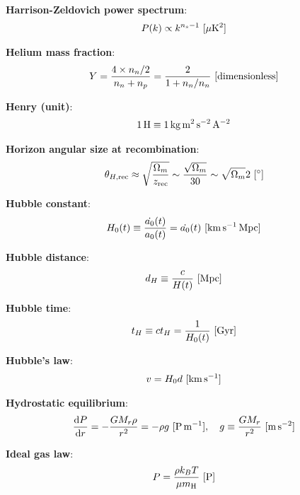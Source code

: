\documentclass[a4paper,10pt]{article}
\begin{document}
{\noindent}\textbf{Harrison-Zeldovich power spectrum}:
\begin{align*}
    P(k) \propto k^{n_s-1} ~ [{\rm \mu K^2}]
\end{align*}

{\noindent}\textbf{Helium mass fraction}:
\begin{align*}
    Y = \frac{4\times n_n/2}{n_n + n_p}  = \frac{2}{1 + n_n/n_n} ~ [{\rm dimensionless}]
\end{align*}

{\noindent}\textbf{Henry (unit)}:
\begin{align*}
    {\rm 1\,H \equiv 1\,kg\,m^2\,s^{-2}\,A^{-2}}
\end{align*}

{\noindent}\textbf{Horizon angular size at recombination}:
\begin{align*}
    \theta_{H,\mathrm{rec}} \approx \sqrt{\frac{\Omega_m}{z_\mathrm{rec}}} \sim \frac{\sqrt{\Omega_m}}{30} \sim \sqrt{\Omega_m}2 ~ [{\rm ^\circ}]
\end{align*}

{\noindent}\textbf{Hubble constant}:
\begin{align*}
    H_0(t) \equiv \dfrac{\dot{a_0}(t)}{a_0(t)} = \dot{a_0}(t) ~ [{\rm km\,s^{-1}\,Mpc}]
\end{align*}

{\noindent}\textbf{Hubble distance}:
\begin{align*}
    d_H \equiv \frac{c}{H(t)} ~ [{\rm Mpc}]
\end{align*}

{\noindent}\textbf{Hubble time}:
\begin{align*}
    t_H \equiv ct_H = \frac{1}{H_0(t)} ~ [{\rm Gyr}]
\end{align*}

{\noindent}\textbf{Hubble's law}:
\begin{align*}
    v = H_0d ~ [{\rm km\,s^{-1}}]
\end{align*}

{\noindent}\textbf{Hydrostatic equilibrium}:
\begin{align*}
    \frac{{\rm d}P}{{\rm d}r} = -\frac{GM_r\rho}{r^2} = -\rho g ~ [{\rm P\,m^{-1}}], ~~~ g \equiv \frac{GM_r}{r^2} ~ [{\rm m\,s^{-2}}]
\end{align*}

{\noindent}\textbf{Ideal gas law}:
\begin{align*}
    P = \frac{\rho k_BT}{\mu m_{\rm H}} ~ [{\rm P}]
\end{align*}
\end{document}
